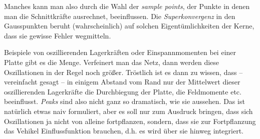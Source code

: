 Manches kann man also durch die Wahl der {\em sample points\/}, der Punkte in denen man
die Schnittkr\"{a}fte ausrechnet, beeinflussen. Die {\em Superkonvergenz\/} in den
Gausspunkten beruht (wahrscheinlich) auf solchen Eigent\"{u}mlichkeiten der Kerne, dass sie
gewisse Fehler \hlq wegmitteln\grq.

Beispiele von oszillierenden Lagerkr\"{a}ften oder Einspannmomenten bei einer Platte gibt es
die Menge. Verfeinert man das Netz, dann werden diese Oszillationen in der Regel noch
gr\"{o}{\ss}er. Tr\"{o}stlich ist es dann zu wissen, dass -- vereinfacht gesagt -- in einigem
Abstand vom Rand nur der Mittelwert dieser oszillierenden Lagerkr\"{a}fte die Durchbiegung
der Platte, die Feldmomente etc. beeinflusst. {\em Peaks\/} sind also nicht ganz so
dramatisch, wie sie aussehen. Das ist nat\"{u}rlich etwas naiv formuliert, aber es soll nur
zum Ausdruck bringen, dass sich Oszillationen ja nicht von alleine fortpflanzen,
sondern, dass sie zur Fortpflanzung das Vehikel Einflussfunktion brauchen, d.h. es wird
\"{u}ber sie hinweg integriert.


